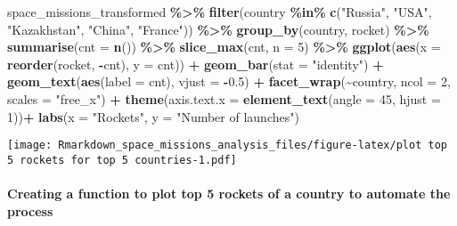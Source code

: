 \documentclass[
]{article}
\newenvironment{Shaded}{\begin{snugshade}}{\end{snugshade}}
\newcommand{\AttributeTok}[1]{\textcolor[rgb]{0.13,0.29,0.53}{#1}}
\newcommand{\DecValTok}[1]{\textcolor[rgb]{0.00,0.00,0.81}{#1}}
\newcommand{\FloatTok}[1]{\textcolor[rgb]{0.00,0.00,0.81}{#1}}
\newcommand{\FunctionTok}[1]{\textcolor[rgb]{0.13,0.29,0.53}{\textbf{#1}}}
\newcommand{\NormalTok}[1]{#1}
\newcommand{\SpecialCharTok}[1]{\textcolor[rgb]{0.81,0.36,0.00}{\textbf{#1}}}
\newcommand{\StringTok}[1]{\textcolor[rgb]{0.31,0.60,0.02}{#1}}
\begin{document}
\begin{Shaded}
\begin{Highlighting}[]
\NormalTok{space\_missions\_transformed }\SpecialCharTok{\%\textgreater{}\%}
  \FunctionTok{filter}\NormalTok{(country }\SpecialCharTok{\%in\%} \FunctionTok{c}\NormalTok{(}\StringTok{"Russia"}\NormalTok{, }\StringTok{"USA"}\NormalTok{, }\StringTok{"Kazakhstan"}\NormalTok{, }\StringTok{"China"}\NormalTok{, }\StringTok{"France"}\NormalTok{)) }\SpecialCharTok{\%\textgreater{}\%}
  \FunctionTok{group\_by}\NormalTok{(country, rocket) }\SpecialCharTok{\%\textgreater{}\%}
  \FunctionTok{summarise}\NormalTok{(}\AttributeTok{cnt =} \FunctionTok{n}\NormalTok{()) }\SpecialCharTok{\%\textgreater{}\%} 
  \FunctionTok{slice\_max}\NormalTok{(cnt, }\AttributeTok{n =} \DecValTok{5}\NormalTok{) }\SpecialCharTok{\%\textgreater{}\%} 
  \FunctionTok{ggplot}\NormalTok{(}\FunctionTok{aes}\NormalTok{(}\AttributeTok{x =} \FunctionTok{reorder}\NormalTok{(rocket, }\SpecialCharTok{{-}}\NormalTok{cnt), }\AttributeTok{y =}\NormalTok{ cnt)) }\SpecialCharTok{+}
  \FunctionTok{geom\_bar}\NormalTok{(}\AttributeTok{stat =} \StringTok{"identity"}\NormalTok{) }\SpecialCharTok{+}
  \FunctionTok{geom\_text}\NormalTok{(}\FunctionTok{aes}\NormalTok{(}\AttributeTok{label =}\NormalTok{ cnt), }\AttributeTok{vjust =} \SpecialCharTok{{-}}\FloatTok{0.5}\NormalTok{) }\SpecialCharTok{+}
  \FunctionTok{facet\_wrap}\NormalTok{(}\SpecialCharTok{\textasciitilde{}}\NormalTok{country, }\AttributeTok{ncol =} \DecValTok{2}\NormalTok{, }\AttributeTok{scales =} \StringTok{"free\_x"}\NormalTok{) }\SpecialCharTok{+}
  \FunctionTok{theme}\NormalTok{(}\AttributeTok{axis.text.x =} \FunctionTok{element\_text}\NormalTok{(}\AttributeTok{angle =} \DecValTok{45}\NormalTok{, }\AttributeTok{hjust =} \DecValTok{1}\NormalTok{))}\SpecialCharTok{+}
  \FunctionTok{labs}\NormalTok{(}\AttributeTok{x =} \StringTok{"Rockets"}\NormalTok{, }\AttributeTok{y =} \StringTok{"Number of launches"}\NormalTok{)}
\end{Highlighting}
\end{Shaded}

\texttt{[image: Rmarkdown\_space\_missions\_analysis\_files/figure-latex/plot top 5 rockets for top 5 countries-1.pdf]}

\hypertarget{creating-a-function-to-plot-top-5-rockets-of-a-country-to-automate-the-process}{%
\paragraph{Creating a function to plot top 5 rockets of a country to
automate the
process}\label{creating-a-function-to-plot-top-5-rockets-of-a-country-to-automate-the-process}}
\end{document}
